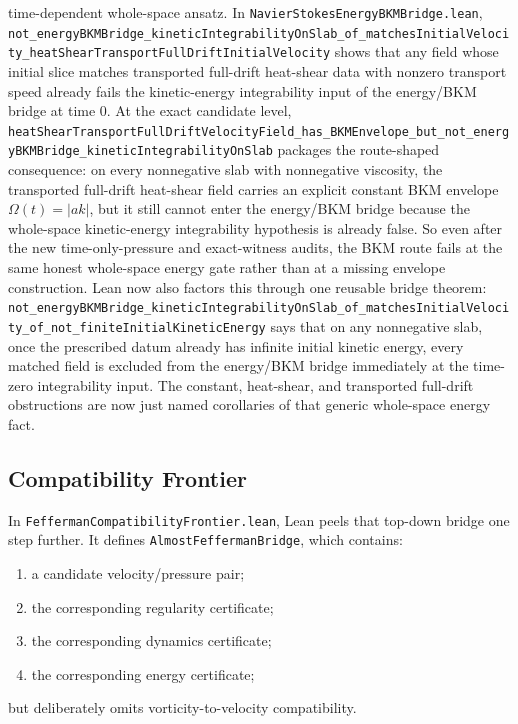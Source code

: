 \documentclass[11pt]{article}
\begin{document}
time-dependent whole-space ansatz.  In
\texttt{NavierStokesEnergyBKMBridge.lean},
\texttt{not\_energyBKMBridge\_kineticIntegrabilityOnSlab\_of\_matchesInitialVelocity\_heatShearTransportFullDriftInitialVelocity}
shows that any field whose initial slice matches transported full-drift
heat-shear data with nonzero transport speed already fails the kinetic-energy
integrability input of the energy/BKM bridge at time \(0\).  At the exact
candidate level,
\texttt{heatShearTransportFullDriftVelocityField\_has\_BKMEnvelope\_but\_not\_energyBKMBridge\_kineticIntegrabilityOnSlab}
packages the route-shaped consequence: on every nonnegative slab with
nonnegative viscosity, the transported full-drift heat-shear field carries an
explicit constant BKM envelope \( \Omega(t)=|a k| \), but it still cannot enter
the energy/BKM bridge because the whole-space kinetic-energy integrability
hypothesis is already false.  So even after the new time-only-pressure and
exact-witness audits, the BKM route fails at the same honest whole-space energy
gate rather than at a missing envelope construction.  Lean now also factors
this through one reusable bridge theorem:
\texttt{not\_energyBKMBridge\_kineticIntegrabilityOnSlab\_of\_matchesInitialVelocity\_of\_not\_finiteInitialKineticEnergy}
says that on any nonnegative slab, once the prescribed datum already has
infinite initial kinetic energy, every matched field is excluded from the
energy/BKM bridge immediately at the time-zero integrability input.  The
constant, heat-shear, and transported full-drift obstructions are now just
named corollaries of that generic whole-space energy fact.

\subsection{Compatibility Frontier}

In \texttt{FeffermanCompatibilityFrontier.lean}, Lean peels that top-down bridge
one step further.  It defines \texttt{AlmostFeffermanBridge}, which contains:
\begin{enumerate}[leftmargin=1.5em]
  \item a candidate velocity/pressure pair;
  \item the corresponding regularity certificate;
  \item the corresponding dynamics certificate;
  \item the corresponding energy certificate;
\end{enumerate}
but deliberately omits vorticity-to-velocity compatibility.
\end{document}

